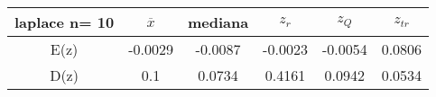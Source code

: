 \begin{tabular}{|c|c|c|c|c|c|}
\hline
laplace n= 10& $\overline{x}$ & mediana & $z_r$ & $z_Q$ & $z_{tr}$ \\ \hline
E(z) & -0.0029 & -0.0087 & -0.0023 & -0.0054 & 0.0806 \\ \hline
D(z) & 0.1 & 0.0734 & 0.4161 & 0.0942 & 0.0534 \\ \hline
\end{tabular}